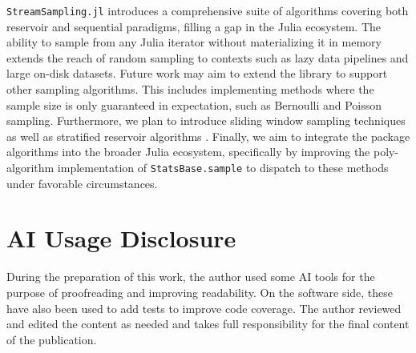 \documentclass{juliacon}
\begin{document}
\texttt{StreamSampling.jl} introduces a comprehensive suite of algorithms covering both reservoir and sequential paradigms, filling a gap in the Julia ecosystem. The ability to sample from any Julia iterator without materializing it in memory extends the reach of random sampling to contexts such as lazy data pipelines and large on-disk datasets. Future work may aim to extend the library to support other sampling algorithms. This includes implementing methods where the sample size is only guaranteed in expectation, such as Bernoulli and Poisson sampling. Furthermore, we plan to introduce sliding window sampling techniques \cite{braverman2012optimal} as well as stratified reservoir algorithms \cite{lee2010stratified}. Finally, we aim to integrate the package algorithms into the broader Julia ecosystem, specifically by improving the poly-algorithm implementation of \texttt{StatsBase.sample} to dispatch to these methods under favorable circumstances.

\section{AI Usage Disclosure}

During the preparation of this work, the author used some AI tools for the purpose of proofreading and improving readability. On the software side, these have also been used to add tests to improve code coverage. The author reviewed and edited the content as needed and takes full responsibility for the final content of the publication.

\balance


\end{document}
